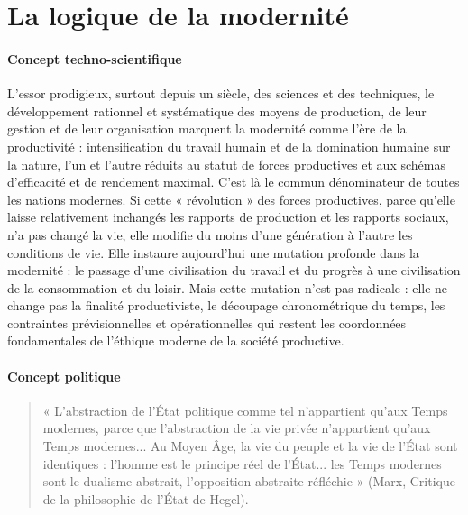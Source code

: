 \section{La logique de la modernité}

\paragraph{Concept techno-scientifique}

L'essor prodigieux, surtout depuis un siècle, des sciences et des techniques, le développement rationnel et systématique des moyens de production, de leur gestion et de leur organisation marquent la modernité comme l'ère de la productivité : intensification du travail humain et de la domination humaine sur la nature, l'un et l'autre réduits au statut de forces productives et aux schémas d'efficacité et de rendement maximal. C'est là le commun dénominateur de toutes les nations modernes. Si cette « révolution » des forces productives, parce qu'elle laisse relativement inchangés les rapports de production et les rapports sociaux, n'a pas changé la vie, elle modifie du moins d'une génération à l'autre les conditions de vie. Elle instaure aujourd'hui une mutation profonde dans la modernité : le passage d'une civilisation du travail et du progrès à une civilisation de la consommation et
du loisir. Mais cette mutation n'est pas radicale : elle ne change pas la finalité productiviste, le découpage chronométrique du temps, les contraintes prévisionnelles et opérationnelles qui restent les coordonnées fondamentales de l'éthique moderne de la société productive.
\paragraph{Concept politique}
\begin{quote}
    « L'abstraction de l'État politique comme tel n'appartient qu'aux Temps modernes, parce que l'abstraction de la vie privée n'appartient qu'aux Temps modernes... Au Moyen Âge, la vie du peuple et la vie de l'État sont identiques : l'homme est le principe réel de l'État... les Temps modernes sont le dualisme abstrait, l'opposition abstraite réfléchie » (Marx, Critique de la philosophie de l'État de Hegel).
\end{quote}

